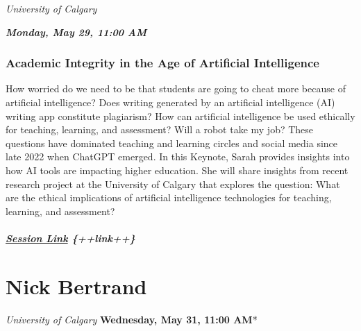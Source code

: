 \documentclass[
]{book}
\begin{document}
\emph{University of Calgary}

\textbf{\emph{Monday, May 29, 11:00 AM}}

\begin{keynote}
\hypertarget{academic-integrity-in-the-age-of-artificial-intelligence}{%
\subsubsection*{Academic Integrity in the Age of Artificial
Intelligence}\label{academic-integrity-in-the-age-of-artificial-intelligence}}

How worried do we need to be that students are going to cheat more
because of artificial intelligence? Does writing generated by an
artificial intelligence (AI) writing app constitute plagiarism? How can
artificial intelligence be used ethically for teaching, learning, and
assessment? Will a robot take my job? These questions have dominated
teaching and learning circles and social media since late 2022 when
ChatGPT emerged. In this Keynote, Sarah provides insights into how AI
tools are impacting higher education. She will share insights from
recent research project at the University of Calgary that explores the
question: What are the ethical implications of artificial intelligence
technologies for teaching, learning, and assessment?

\hypertarget{session-link-link}{%
\subparagraph{\texorpdfstring{\href{}{Session Link}
\{++link++\}}{Session Link \{++link++\}}}\label{session-link-link}}
\end{keynote}

\hypertarget{nick-bertrand}{%
\section*{Nick Bertrand}\label{nick-bertrand}}

\emph{University of Calgary
}\textbf{Wednesday, May 31, 11:00 AM}*
\end{document}
